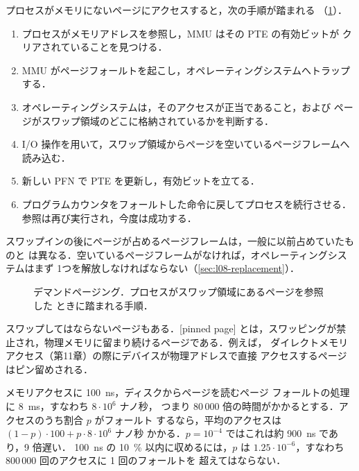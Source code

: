 \documentclass[../main.tex]{subfiles}
\begin{document}
プロセスがメモリにないページにアクセスすると，次の手順が踏まれる
（\cref{fig:l08-page-fault}）．
\begin{enumerate}
  \item プロセスがメモリアドレスを参照し，MMU はその PTE の有効ビットが
    クリアされていることを見つける．
  \item MMU がページフォールトを起こし，オペレーティングシステムへトラップ
    する．
  \item オペレーティングシステムは，そのアクセスが正当であること，および
    ページがスワップ領域のどこに格納されているかを判断する．
  \item I/O 操作を用いて，スワップ領域からページを空いているページフレームへ
    読み込む．
  \item 新しい PFN で PTE を更新し，有効ビットを立てる．
  \item プログラムカウンタをフォールトした命令に戻してプロセスを続行させる．
    参照は再び実行され，今度は成功する．
\end{enumerate}
スワップインの後にページが占めるページフレームは，一般に以前占めていたものと
は異なる．空いているページフレームがなければ，オペレーティングシステムはまず
1つを解放しなければならない（\cref{sec:l08-replacement}）．

\begin{figure}[htbp]
  \centering
  
  \caption{デマンドページング．プロセスがスワップ領域にあるページを参照した
    ときに踏まれる手順．}
  \label{fig:l08-page-fault}
\end{figure}

スワップしてはならないページもある．[pinned page]
とは，スワッピングが禁止され，物理メモリに留まり続けるページである．例えば，
ダイレクトメモリアクセス（第11章）の際にデバイスが物理アドレスで直接
アクセスするページはピン留めされる．

\begin{example}
  メモリアクセスに \SI{100}{\nano\second}，ディスクからページを読むページ
  フォールトの処理に \SI{8}{\milli\second}，すなわち $8 \cdot 10^{6}$ ナノ秒，
  つまり 80\,000 倍の時間がかかるとする．アクセスのうち割合 $p$ がフォールト
  するなら，平均のアクセスは $(1-p) \cdot 100 + p \cdot 8 \cdot 10^{6}$ ナノ秒
  かかる．$p = 10^{-4}$ ではこれは約 \SI{900}{\nano\second} であり，9 倍遅い．
  \SI{100}{\nano\second} の \SI{10}{\percent} 以内に収めるには，$p$ は
  $1.25 \cdot 10^{-6}$，すなわち 800\,000 回のアクセスに 1 回のフォールトを
  超えてはならない．
\end{example}
\end{document}
